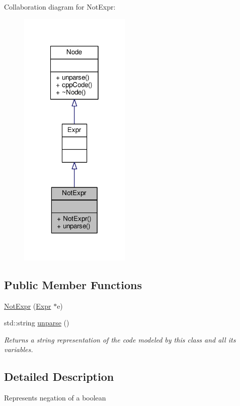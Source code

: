 Collaboration diagram for Not\-Expr\-:\nopagebreak
\begin{figure}[H]
\begin{center}
\leavevmode
\includegraphics[width=150pt]{classNotExpr__coll__graph}
\end{center}
\end{figure}
\subsection*{Public Member Functions}
\begin{DoxyCompactItemize}
\item 
\hyperlink{classNotExpr_a7939cb5c7141f8ede498cef1e8f9694c}{Not\-Expr} (\hyperlink{classExpr}{Expr} $\ast$e)
\item 
std\-::string \hyperlink{classNotExpr_aa1632e9a8abf6aa1bf110afed379066b}{unparse} ()
\begin{DoxyCompactList}\small\item\em Returns a string representation of the code modeled by this class and all its variables. \end{DoxyCompactList}\end{DoxyCompactItemize}


\subsection{Detailed Description}
Represents negation of a boolean \par
 


